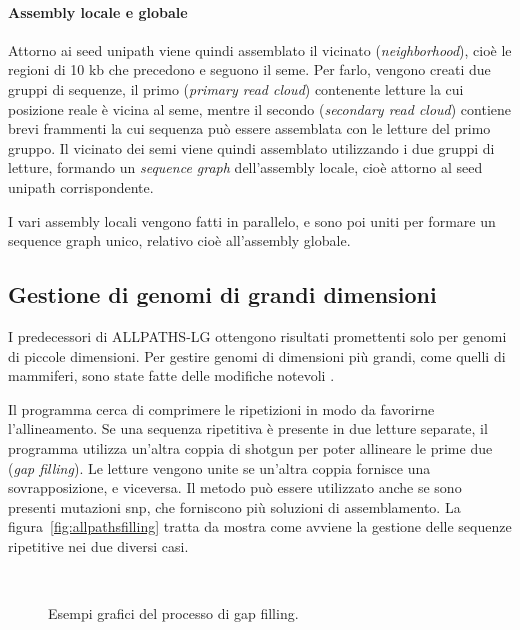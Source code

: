 \documentclass[crop=false, class=book]{standalone}
\begin{document}
	\paragraph{Assembly locale e globale}
	Attorno ai seed unipath viene quindi assemblato il vicinato (\textit{neighborhood}), cioè le regioni di 10 kb che precedono e seguono il seme. Per farlo, vengono creati due gruppi di sequenze, il primo (\textit{primary read cloud}) contenente letture la cui posizione reale è vicina al seme, mentre il secondo (\textit{secondary read cloud}) contiene brevi frammenti la cui sequenza può essere assemblata con le letture del primo gruppo. Il vicinato dei semi viene quindi assemblato utilizzando i due gruppi di letture, formando un \textit{sequence graph} dell'assembly locale, cioè attorno al seed unipath corrispondente.
	
	I vari assembly locali vengono fatti in parallelo, e sono poi uniti per formare un sequence graph unico, relativo cioè all'assembly globale.
	
	
	\subsection{Gestione di genomi di grandi dimensioni}
	I predecessori di ALLPATHS-LG ottengono risultati promettenti solo per genomi di piccole dimensioni. Per gestire genomi di dimensioni più grandi, come quelli di mammiferi, sono state fatte delle modifiche notevoli \cite{gnerre2011high}.

	Il programma cerca di comprimere le ripetizioni in modo da favorirne l'allineamento. Se una sequenza ripetitiva è presente in due letture separate, il programma utilizza un'altra coppia di shotgun per poter allineare le prime due (\textit{gap filling}). Le letture vengono unite se un'altra coppia fornisce una sovrapposizione, e viceversa. Il metodo può essere utilizzato anche se sono presenti mutazioni \gls{snp}, che forniscono più soluzioni di assemblamento. La figura~\vref{fig:allpathsfilling} tratta da \cite{gnerre2011high} mostra come avviene la gestione delle sequenze ripetitive nei due diversi casi.

	\begin{figure}
		\centering
		 \\
		\caption{Esempi grafici del processo di gap filling.}
		\label{fig:allpathsfilling}
	\end{figure}
	
\end{document}

